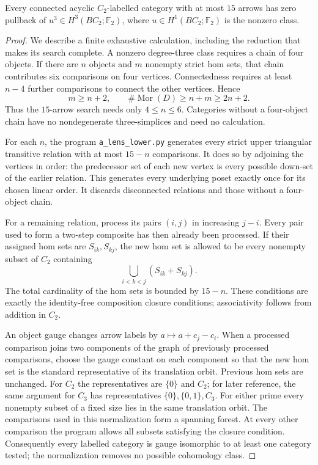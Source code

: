 \begin{lemma}
\label{C:lens-exhaustion}
Every connected acyclic $C_2$-labelled category with at most $15$ arrows
has zero pullback of $u^3\in H^3(BC_2;\mathbb F_2)$, where
$u\in H^1(BC_2;\mathbb F_2)$ is the nonzero class.
\end{lemma}
\begin{proof}
We describe a finite exhaustive calculation, including the reduction
that makes its search complete. A nonzero degree-three class requires
a chain of four objects. If there are $n$ objects and $m$ nonempty
strict hom sets, that chain contributes six comparisons on four
vertices. Connectedness requires at least $n-4$ further comparisons
to connect the other vertices. Hence
\[
 m\geq n+2,\qquad \#\operatorname{Mor}(D)\geq n+m\geq2n+2.
\]
Thus the $15$-arrow search needs only $4\leq n\leq6$. Categories
without a four-object chain have no nondegenerate three-simplices and
need no calculation.

For each $n$, the program \texttt{a\_lens\_lower.py} generates every
strict upper triangular transitive relation with at most $15-n$
comparisons. It does so by adjoining the vertices in order: the
predecessor set of each new vertex is every possible down-set of the
earlier relation. This generates every underlying poset exactly once
for its chosen linear order. It discards disconnected relations and
those without a four-object chain.

For a remaining relation, process its pairs $(i,j)$ in increasing
$j-i$. Every pair used to form a two-step composite has then already
been processed. If their assigned hom sets are $S_{ik},S_{kj}$, the
new hom set is allowed to be every nonempty subset of $C_2$ containing
\[
 \bigcup_{i<k<j}(S_{ik}+S_{kj}).
\]
The total cardinality of the hom sets is bounded by $15-n$. These
conditions are exactly the identity-free composition closure conditions;
associativity follows from addition in $C_2$.

An object gauge changes arrow labels by $a\mapsto a+c_j-c_i$.
When a processed comparison joins two components of the graph of
previously processed comparisons, choose the gauge constant on each
component so that the new hom set is the standard representative of
its translation orbit. Previous hom sets are unchanged. For $C_2$ the
representatives are $\{0\}$ and $C_2$; for later reference, the same
argument for $C_3$ has representatives $\{0\},\{0,1\},C_3$.
For either prime every nonempty subset of a fixed size lies in the
same translation orbit. The comparisons used in this normalization
form a spanning forest. At every other comparison the program allows
all subsets satisfying the closure condition. Consequently every
labelled category is gauge isomorphic to at least one category tested;
the normalization removes no possible cohomology class.


\end{proof}
